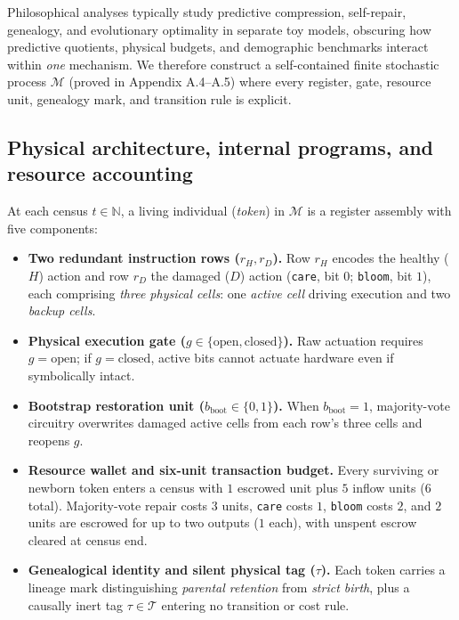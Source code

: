 \documentclass[11pt,a4paper]{article}
\providecommand{\tightlist}{\setlength{\itemsep}{2pt}\setlength{\parskip}{0pt}}
\begin{document}
Philosophical analyses typically study predictive compression,
self-repair, genealogy, and evolutionary optimality in separate toy
models, obscuring how predictive quotients, physical budgets, and
demographic benchmarks interact within \emph{one} mechanism. We
therefore construct a self-contained finite stochastic process
\(\mathcal{M}\) (proved in Appendix A.4--A.5) where every register,
gate, resource unit, genealogy mark, and transition rule is explicit.

\subsection{Physical architecture, internal programs, and resource
accounting}\label{physical-architecture-internal-programs-and-resource-accounting}

At each census \(t \in \mathbb{N}\), a living individual (\emph{token})
in \(\mathcal{M}\) is a register assembly with five components:

\begin{itemize}
\tightlist
\item
  \textbf{Two redundant instruction rows (\(r_H, r_D\)).} Row \(r_H\)
  encodes the healthy (\(H\)) action and row \(r_D\) the damaged (\(D\))
  action (\texttt{care}, bit \(0\); \texttt{bloom}, bit \(1\)), each
  comprising \emph{three physical cells}: one \emph{active cell} driving
  execution and two \emph{backup cells}.
\item
  \textbf{Physical execution gate
  (\(g \in \{\mathrm{open}, \mathrm{closed}\}\)).} Raw actuation
  requires \(g = \mathrm{open}\); if \(g = \mathrm{closed}\), active
  bits cannot actuate hardware even if symbolically intact.
\item
  \textbf{Bootstrap restoration unit
  (\(b_{\mathrm{boot}} \in \{0,1\}\)).} When \(b_{\mathrm{boot}} = 1\),
  majority-vote circuitry overwrites damaged active cells from each
  row's three cells and reopens \(g\).
\item
  \textbf{Resource wallet and six-unit transaction budget.} Every
  surviving or newborn token enters a census with \(1\) escrowed unit
  plus \(5\) inflow units (\(6\) total). Majority-vote repair costs
  \(3\) units, \texttt{care} costs \(1\), \texttt{bloom} costs \(2\),
  and \(2\) units are escrowed for up to two outputs (\(1\) each), with
  unspent escrow cleared at census end.
\item
  \textbf{Genealogical identity and silent physical tag (\(\tau\)).}
  Each token carries a lineage mark distinguishing \emph{parental
  retention} from \emph{strict birth}, plus a causally inert tag
  \(\tau \in \mathcal{T}\) entering no transition or cost rule.
\end{itemize}
\end{document}
